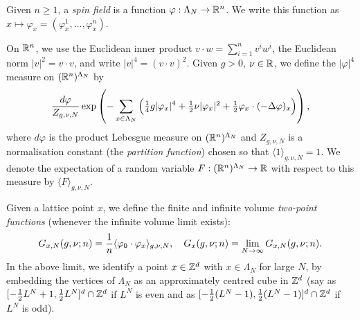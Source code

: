 
Given $n \ge 1$,
a \emph{spin field} is a function $\varphi : \Lambda_N \rightarrow {\mathbb R}^n$.
We write this function as $x \mapsto \varphi_x =(\varphi_x^1,\ldots,\varphi_x^n)$.

On ${\mathbb R}^n$, we use the Euclidean inner product $v \cdot w = \sum_{i=1}^n v^i w^i$,
the Euclidean norm $|v|^2 = v\cdot v$,
and write $|v|^4 = (v\cdot v)^2$.
Given $g>0$, $\nu \in {\mathbb R}$, we define
the $|\varphi|^4$ measure on $({\mathbb R}^n)^{\Lambda_N}$ by
\begin{equation}
\frac{d\varphi}{Z_{g,\nu,N}} \exp\left(-\sum_{x\in\Lambda_N}
  \Big(\tfrac{1}{4} g |\varphi_x|^4 + \textstyle{\frac 12} \nu |\varphi_x|^2
    + \textstyle{\frac 12} \varphi_x\cdot (-\Delta \varphi)_x 
  \Big)\right),
\end{equation}
where $d\varphi$ is the product Lebesgue measure on $({\mathbb R}^n)^{\Lambda_N}$
and $Z_{g,\nu,N}$ is a normalisation constant (the \emph{partition function})
chosen so that $\langle 1 \rangle_{g,\nu,N} = 1$. We denote the expectation
of a random variable $F:({\mathbb R}^n)^{\Lambda_N} \rightarrow {\mathbb R}$ with respect to this measure
by $\langle F \rangle_{g,\nu,N}$.

Given a lattice point $x$,
we define the finite and infinite volume \emph{two-point functions}
(whenever the infinite volume limit exists):
\begin{equation}\label{e:two-point-function-phi4}
G_{x, N}(g,\nu; n) =
\frac{1}{n} \langle \varphi_0 \cdot \varphi_x \rangle_{g,\nu, N},
\quad
G_x(g,\nu; n) = \lim_{N \rightarrow \infty} G_{x, N}(g,\nu; n).
\end{equation}
In the above limit, we identify a point $x \in { {{\mathbb Z}}^d }$ with $x \in \Lambda_N$
for large $N$, by embedding the vertices of $\Lambda_N$ as an approximately
centred cube in ${\mathbb Z}^d$ (say as $[-\frac12 L^N+1,\frac12 L^N]^d \cap {\mathbb Z}^d$ if $L^N$ is even
and as $[-\frac12 (L^N-1), \frac12 (L^N-1)]^d \cap {\mathbb Z}^d$ if $L^N$ is odd).

